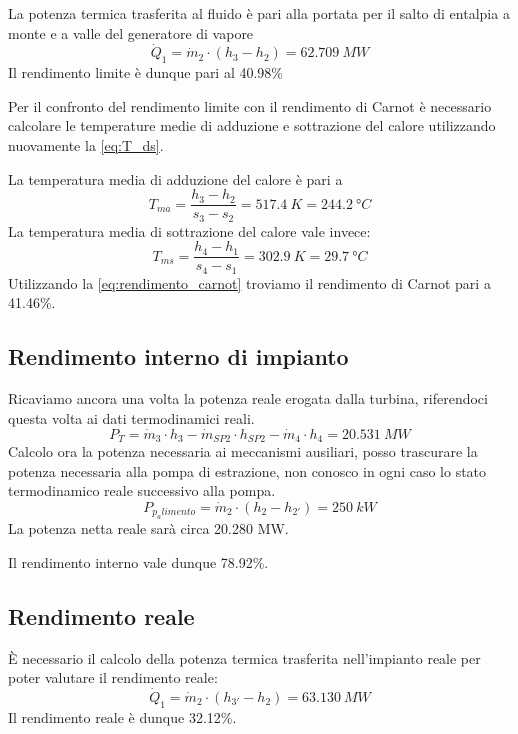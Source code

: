 La potenza termica trasferita al fluido è pari alla portata per il salto di entalpia a monte e a valle del generatore di vapore
\begin{equation*}
    \dot Q_1 = \dot m_2 \cdot (h_3-h_2) = 62.709\ MW
\end{equation*}
Il rendimento limite è dunque pari al 40.98\%

Per il confronto del rendimento limite con il rendimento di Carnot è necessario calcolare le temperature medie di adduzione e sottrazione del calore
utilizzando nuovamente la \eqref{eq:T_ds}.

La temperatura media di adduzione del calore è pari a
\begin{equation*}
    T_{ma} = \frac{h_3 - h_2}{s_3 - s_2} = 517.4\ K = 244.2\ \text{°}C
\end{equation*}
La temperatura media di sottrazione del calore vale invece:
\begin{equation*}
    T_{ms} = \frac{h_4-h_1}{s_4 - s_1} = 302.9\ K = 29.7\ \text{°}C
\end{equation*}
Utilizzando la \eqref{eq:rendimento_carnot} troviamo il rendimento di Carnot pari a 41.46\%.

\subsection{Rendimento interno di impianto}
Ricaviamo ancora una volta la potenza reale erogata dalla turbina, riferendoci questa volta ai dati termodinamici reali.
\begin{equation*}
    P_T = \dot m_3 \cdot h_3 - \dot m_{SP2} \cdot h_{SP2} - \dot m_4 \cdot h_4 = 20.531\ MW
\end{equation*}
Calcolo ora la potenza necessaria ai meccanismi ausiliari, posso trascurare la potenza necessaria alla pompa di estrazione, non conosco in ogni caso lo stato termodinamico
reale successivo alla pompa.
\begin{equation*}
    P_{p_alimento} = \dot m_2 \cdot \left( h_2 - h_{2'} \right) = 250\ kW 
\end{equation*}
La potenza netta reale sarà circa 20.280 MW.

Il rendimento interno vale dunque 78.92\%.

\subsection{Rendimento reale}
È necessario il calcolo della potenza termica trasferita nell'impianto reale per poter valutare il rendimento reale:
\begin{equation*}
    \dot Q_1 = \dot m_2 \cdot (h_{3'} - h_2) = 63.130\ MW
\end{equation*}
Il rendimento reale è dunque 32.12\%.

